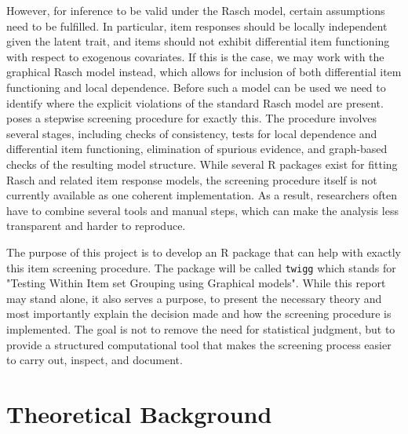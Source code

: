 \documentclass[a4project,12pt]{article}
\theoremstyle{examplestyle}
\theoremstyle{defstyle}
\theoremstyle{thmstyle}
\begin{document}
However, for inference to be valid under the Rasch model, certain assumptions need to be fulfilled. In particular, item responses should be locally independent given the latent trait, and items should not exhibit differential item functioning with respect to exogenous covariates. If this is the case, we may work with the graphical Rasch model instead, which allows for inclusion of both differential item functioning and local dependence. Before such a model can be used we need to identify where the explicit violations of the standard Rasch model are present. \cite{Kreiner_Christensen_2011} poses a stepwise screening procedure for exactly this. The procedure involves several stages, including checks of consistency, tests for local dependence and differential item functioning, elimination of spurious evidence, and graph-based checks of the resulting model structure. While several R packages exist for fitting Rasch and related item response models, the screening procedure itself is not currently available as one coherent implementation. As a result, researchers often have to combine several tools and manual steps, which can make the analysis less transparent and harder to reproduce.

The purpose of this project is to develop an R package that can help with exactly this item screening procedure. The package will be called \texttt{twigg} which stands for "Testing Within Item set Grouping using Graphical models". While this report may stand alone, it also serves a purpose, to present the necessary theory and most importantly explain the decision made and how the screening procedure is implemented. The goal is not to remove the need for statistical judgment, but to provide a structured computational tool that makes the screening process easier to carry out, inspect, and document.

\section{Theoretical Background}
\end{document}
